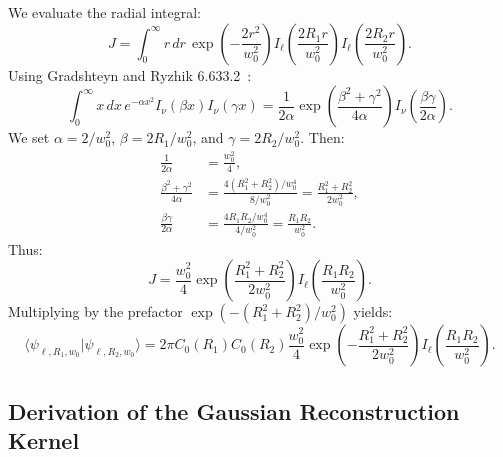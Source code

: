\documentclass{optica-article}
\begin{document}
We evaluate the radial integral:
\begin{equation}
J = \int_0^\infty r \, dr \, \exp\left( - \frac{2 r^2}{w_0^2} \right) I_\ell\left( \frac{2 R_1 r}{w_0^2} \right) I_\ell\left( \frac{2 R_2 r}{w_0^2} \right).
\label{eq:app_j_integral}
\end{equation}
Using Gradshteyn and Ryzhik 6.633.2~\cite{Gradshteyn2014}:
\begin{equation}
\int_0^\infty x \, dx \, e^{-\alpha x^2} I_\nu(\beta x) I_\nu(\gamma x) = \frac{1}{2\alpha} \exp\left( \frac{\beta^2 + \gamma^2}{4\alpha} \right) I_\nu\left( \frac{\beta \gamma}{2\alpha} \right).
\label{eq:app_weber_ref}
\end{equation}
We set $\alpha = 2 / w_0^2$, $\beta = 2 R_1 / w_0^2$, and $\gamma = 2 R_2 / w_0^2$. Then:
\begin{align}
\frac{1}{2\alpha} &= \frac{w_0^2}{4}, \\
\frac{\beta^2 + \gamma^2}{4\alpha} &= \frac{4(R_1^2 + R_2^2) / w_0^4}{8 / w_0^2} = \frac{R_1^2 + R_2^2}{2 w_0^2}, \\
\frac{\beta \gamma}{2\alpha} &= \frac{4 R_1 R_2 / w_0^4}{4 / w_0^2} = \frac{R_1 R_2}{w_0^2}.
\end{align}
Thus:
\begin{equation}
J = \frac{w_0^2}{4} \exp\left( \frac{R_1^2 + R_2^2}{2 w_0^2} \right) I_\ell\left( \frac{R_1 R_2}{w_0^2} \right).
\label{eq:app_j_result}
\end{equation}
Multiplying by the prefactor $\exp(-(R_1^2 + R_2^2)/w_0^2)$ yields:
\begin{equation}
\langle \psi_{\ell, R_1, w_0} | \psi_{\ell, R_2, w_0} \rangle = 2\pi C_0(R_1) C_0(R_2) \frac{w_0^2}{4} \exp\left( - \frac{R_1^2 + R_2^2}{2 w_0^2} \right) I_\ell\left( \frac{R_1 R_2}{w_0^2} \right).
\label{eq:app_exact_inner_prod}
\end{equation}

\subsection{Derivation of the Gaussian Reconstruction Kernel}
\end{document}
